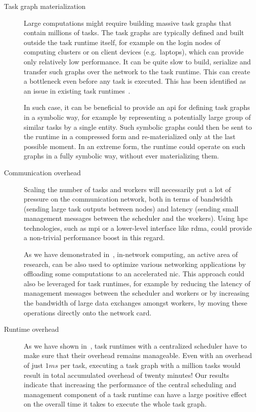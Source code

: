 \begin{description}
	\item[Task graph materialization] Large computations might require building massive task graphs that contain millions of tasks. The
		task graphs are typically defined and built outside the task runtime itself, for example on the
		login nodes of computing clusters or on client devices (e.g.\ laptops), which can provide only
		relatively low performance. It can be quite slow to build, serialize and transfer such graphs over
		the network to the task runtime. This can create a bottleneck even before any task is executed.
		This has been identified as an issue in existing task runtimes~\cite{dask-client-perf}.

		In such case, it can be beneficial to provide an \gls{api} for defining task graphs
		in a symbolic way, for example by representing a potentially large group of similar tasks by a
		single entity. Such symbolic graphs could then be sent to the runtime in a compressed form and
		re-materialized only at the last possible moment. In an extreme form, the runtime could operate on
		such graphs in a fully symbolic way, without ever materializing them.
	\item[Communication overhead] Scaling the number of tasks and workers will necessarily put a lot of pressure on the communication
		network, both in terms of bandwidth (sending large task outputs between nodes) and latency (sending
		small management messages between the scheduler and the workers). Using \gls{hpc}
		technologies, such as \gls{mpi} or a lower-level interface like
		\gls{rdma}, could provide a non-trivial performance boost in this regard.

		As we have demonstrated in~\cite{pspin, spin2}, in-network computing, an active area of
		research, can be also used to optimize various networking applications by offloading some
		computations to an accelerated \gls{nic}. This approach could also be leveraged for
		task runtimes, for example by reducing the latency of management messages between the scheduler and
		workers or by increasing the bandwidth of large data exchanges amongst workers, by moving these
		operations directly onto the network card.
	\item[Runtime overhead] As we have shown in~\cite{rsds}, task runtimes with a centralized scheduler have to
		make sure that their overhead remains manageable. Even with an overhead of just
		$1ms$ per task, executing a task graph with a million tasks would result in
		total accumulated overhead of twenty minutes! Our results indicate that increasing the performance
		of the central scheduling and management component of a task runtime can have a large positive
		effect on the overall time it takes to execute the whole task graph.


\end{description}
